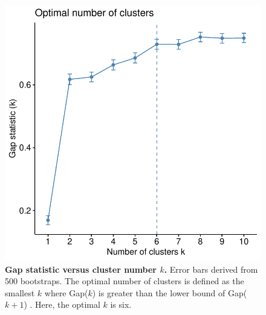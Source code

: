 \begin{figure}
    \centering
    \includegraphics[width=1.0\textwidth,page=1]{mainmatter/figures/chapter_04/plot_gene_set_enrichment.spline_fviz_nbclust_gap_stat.pdf}
    \caption{
        \textbf{Gap statistic versus cluster number $k$.}
        Error bars derived from 500 bootstraps. 
        The optimal number of clusters is defined as the smallest $k$ where Gap($k$) is greater than the lower bound of Gap($k+1$) \autocite{tibshirani2001EstimatingNumberClusters}.
        Here, the optimal $k$ is six.
    }
    \label{fig:multipants_dge_spline_fviz_nbclust_gap_stat}
\end{figure}

